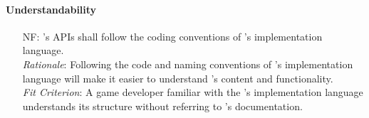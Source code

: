 \paragraph{Understandability}
\noindent \begin{itemize}[wide=0pt, leftmargin=*]

    \item[NF\refstepcounter{nfnum}\thenfnum \label{N_Conventions}:]
    \progname{}'s APIs shall follow the coding conventions of \progname{}'s
    implementation language. \vspace*{1mm}\\
    \textit{Rationale}: Following the code and naming conventions of
    \progname{}'s implementation language will make it easier to understand
    \progname{}'s content and functionality. \vspace*{1mm}\\
    \textit{Fit Criterion}: A game developer familiar with the \progname{}'s
    implementation language understands its structure without referring to
    \progname{}'s documentation.

\end{itemize}

